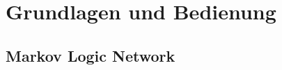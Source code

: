 \graphicspath{{./images/}}      
\def\CHAPTERONE{./chapters/Chapter-1} 

\chapter{Grundlagen und Bedienung}
\label{chap:basics}
%	

\section{Markov Logic Network}
\label{chap:mln}